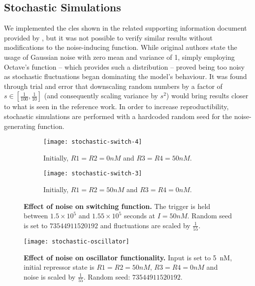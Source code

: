   \subsection{Stochastic Simulations}

    We implemented the \ac{cles} shown in the related supporting information document provided by \citet{multif}, but it was not possible to verify similar results without modifications to the noise-inducing function.
    While original authors state the usage of Gaussian noise with zero mean and variance of 1, simply employing Octave's  function -- which provides such a distribution \cite{randn} -- proved being too noisy as stochastic fluctuations began dominating the model's behaviour.
    It was found through trial and error that downscaling random numbers by a factor of $s \in [\frac{1}{100}, \frac{1}{10}]$ (and consequently scaling variance by $s^2$) would bring results closer to what is seen in the reference work.
    In order to increase reproductibility, stochastic simulations are performed with a hardcoded random seed for the noise-generating function.

    \begin{figure}[!htb]
      \centering
      \begin{subfigure}[t]{0.8\textwidth}
        \centering
        \texttt{[image: stochastic-switch-4]}
        \caption{Initially, $R1 = R2 = 0nM$ and $R3 = R4 = 50nM$.}
        \label{fig:stochastic-switch-4}
      \end{subfigure}
      \begin{subfigure}[t]{0.8\textwidth}
        \centering
        \texttt{[image: stochastic-switch-3]}
        \caption{Initially, $R1 = R2 = 50nM$ and $R3 = R4 = 0nM$.}
        \label{fig:stochastic-switch-3}
      \end{subfigure}
      \caption{\textbf{Effect of noise on switching function.} The trigger is held between $1.5 \times 10^5$ and $1.55 \times 10^5$ seconds at $I = 50 nM$. Random seed is set to $73544911520192$ and fluctuations are scaled by $\frac{1}{55}$.}
      \label{fig:stochastic-switch}
    \end{figure}

    \begin{figure}[!htb]
      \centering
      \texttt{[image: stochastic-oscillator]}
      \caption{\textbf{Effect of noise on oscillator functionality.} Input is set to \SI{5}{\nano M}, initial repressor state is $R1 = R2 = 50nM$, $R3 = R4 = 0nM$ and noise is scaled by $\frac{1}{55}$. Random seed: $73544911520192$.}
      \label{fig:stochastic-oscillator}
    \end{figure}

